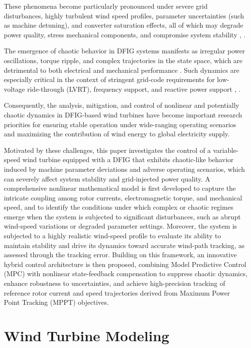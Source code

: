 \documentclass[conference]{IEEEtran}
\begin{document}
These phenomena become particularly pronounced under severe grid disturbances, highly turbulent wind speed profiles, parameter uncertainties (such as machine detuning), and converter saturation effects, all of which may degrade power quality, stress mechanical components, and compromise system stability \cite{b16}, \cite{b17}.

The emergence of chaotic behavior in DFIG systems manifests as irregular power oscillations, torque ripple, and complex trajectories in the state space, which are detrimental to both electrical and mechanical performance \cite{b18}. Such dynamics are especially critical in the context of stringent grid-code requirements for low-voltage ride-through (LVRT), frequency support, and reactive power support \cite{b19}, \cite{b20}.

Consequently, the analysis, mitigation, and control of nonlinear and potentially chaotic dynamics in DFIG-based wind turbines have become important research priorities for ensuring stable operation under wide-ranging operating scenarios and maximizing the contribution of wind energy to global electricity supply.

Motivated by these challenges, this paper investigates the control of a variable-speed wind turbine equipped with a DFIG that exhibits chaotic-like behavior induced by machine parameter deviations and adverse operating scenarios, which can severely affect system stability and grid-injected power quality. A comprehensive nonlinear mathematical model is first developed to capture the intricate coupling among rotor currents, electromagnetic torque, and mechanical speed, and to identify the conditions under which complex or chaotic regimes emerge when the system is subjected to significant disturbances, such as abrupt wind-speed variations or degraded parameter settings. Moreover, the system is subjected to a highly realistic wind-speed profile to evaluate its ability to maintain stability and drive its dynamics toward accurate wind-path tracking, as assessed through the tracking error. Building on this framework, an innovative hybrid control architecture is then proposed, combining Model Predictive Control (MPC) with nonlinear state-feedback compensation to suppress chaotic dynamics, enhance robustness to uncertainties, and achieve high-precision tracking of reference rotor current and speed trajectories derived from Maximum Power Point Tracking (MPPT) objectives.

\section{Wind Turbine Modeling}
\end{document}
